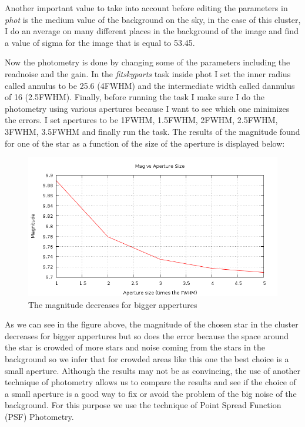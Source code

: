 Another important value to take into account before editing the parameters in \textit{phot} is the medium value of the background on the sky, in the case of this cluster, I do an average on many different places in the background of the image and find a value of sigma for the image that is equal to 53.45.

Now the photometry is done by changing some of the parameters including the readnoise and the gain. In the \textit{fitskyparts} task inside phot I set the inner radius called annulus to be 25.6 (4FWHM) and the intermediate width called dannulus of 16 (2.5FWHM). Finally, before running the task I make sure I do the photometry using various apertures because I want to see which one minimizes the errors. I set apertures to be 1FWHM, 1.5FWHM, 2FWHM, 2.5FWHM, 3FWHM, 3.5FWHM and finally run the task. The results of the magnitude found for one of the star as a function of the size of the aperture is displayed below:

\begin{figure}[H]
\centering
\includegraphics[width=12cm]{images/mag_vs_ap_size.png}
\caption[Photometry results of Magnitudes vs Size of apertures]{The magnitude decreases for bigger appertures}
\end{figure}

As we can see in the figure above, the magnitude of the chosen star in the cluster decreases for bigger appertures but so does the error because the space around the star is crowded of more stars and noise coming from the stars in the background so we infer that for crowded areas like this one the best choice is a small aperture. Although the results may not be as convincing, the use of another technique of photometry allows us to compare the results and see if the choice of a small aperture is a good way to fix or avoid the problem of the big noise of the background. For this purpose we use the technique of Point Spread Function (PSF) Photometry.

